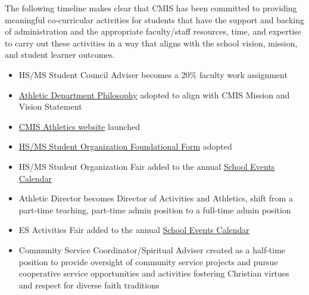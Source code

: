 
\begin{findings}

The following timeline makes clear that CMIS has been committed to providing meaningful co-curricular activities for students that have the support and backing of administration and the appropriate faculty/staff resources, time, and expertise to carry out these activities in a way that aligns with the school vision, mission, and student learner outcomes.

\begin{itemize}
\item HS/MS Student Council Adviser becomes a 20\% faculty work assignment
\item \href{https://docs.google.com/document/d/1sTrMTOsEmYo4TcWgqYYYepmbt43RhWDNO9Juxo3xS20/edit?usp=sharing}{Athletic Department Philosophy} adopted to align with CMIS Mission and Vision Statement
\item \href{http://blogs.cmis.ac.th/eagles/athletics/}{CMIS Athletics website} launched
\end{itemize}

\begin{itemize}
\item \href{http://blogs.cmis.ac.th/eagles/clubs-activities/policies-forms/}{HS/MS Student Organization Foundational Form} adopted
\item HS/MS Student Organization Fair added to the annual \href{http://blogs.cmis.ac.th/eagles/calendars/events-calendar/}{School Events Calendar}
\end{itemize}

\begin{itemize}
\item Athletic Director becomes Director of Activities and Athletics, shift from a part-time teaching, part-time admin position to a full-time admin position
\item ES Activities Fair added to the annual \href{http://blogs.cmis.ac.th/eagles/calendars/events-calendar/}{School Events Calendar}
\item Community Service Coordinator/Spiritual Adviser created as a half-time position to provide oversight of community service projects and pursue cooperative service opportunities and activities fostering Christian virtues and respect for diverse faith traditions      
\end{itemize}


\end{findings}
